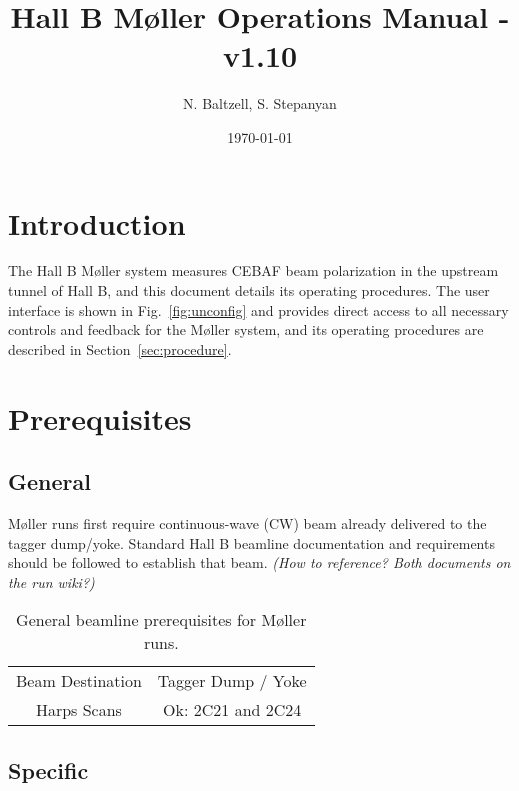 \documentclass[amsmath,amssymb,notitlepage,12pt]{revtex4}
\begin{document}
\title{Hall B M{\o}ller Operations Manual - v1.10}
\date{\today}
\author{N. Baltzell, S. Stepanyan}
\begin{abstract}
\end{abstract}
\maketitle

\section{Introduction}

The Hall B M{\o}ller system measures CEBAF beam polarization in the upstream tunnel of Hall B, and this document details its operating procedures.  The user interface is shown in Fig.~\ref{fig:unconfig} and provides direct access to all necessary controls and feedback for the M{\o}ller system, and its operating procedures are described in Section~\ref{sec:procedure}.

\section{Prerequisites}\label{sec:prereq}

\subsection{General}

M{\o}ller runs first require continuous-wave (CW) beam already delivered to the tagger dump/yoke.  Standard Hall B beamline documentation and requirements should be followed to establish that beam.  {\em (How to reference?  Both documents on the run wiki?)}

\begin{table}[htbp]\centering
    \begin{tabular}{c|c}\toprule[1.5pt]
        Beam Destination & Tagger Dump / Yoke \\
        Harps Scans & Ok: 2C21 and 2C24\\ 
        \bottomrule[1.5pt]
    \end{tabular}
    \caption{General beamline prerequisites for M{\o}ller runs.}
\end{table}

\subsection{Specific}
\end{document}
